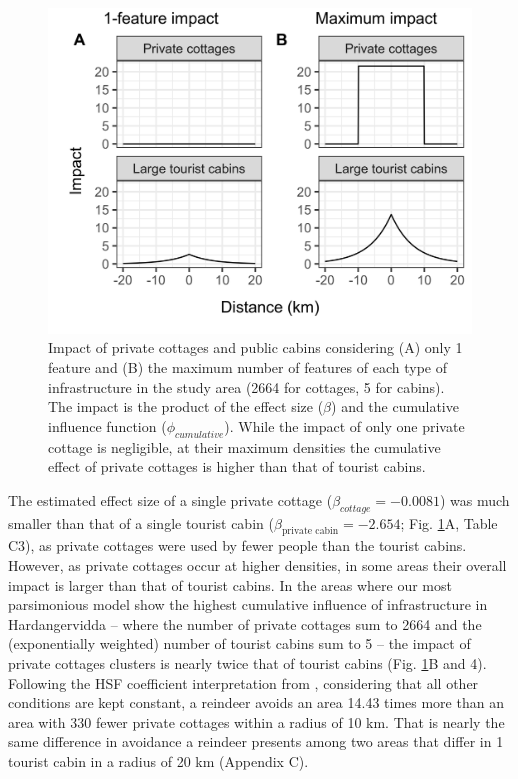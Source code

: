 \documentclass[titlepage]{article}
\begin{document}
\begin{figure}[h]
\centering
\includegraphics[width=1\textwidth,center]{figures/reindeer_zoi_impact_single_multiple_features.png}
\caption{\label{fig:impact_plot} Impact of private cottages and public cabins considering (A) only 1 feature and (B) the maximum number of features of each type of infrastructure in the study area (2664 for cottages, 5 for cabins). The impact is the product of the effect size ($\beta$) and the cumulative influence function ($\phi_{cumulative}$). While the impact of only one private cottage is negligible, at their maximum densities the cumulative effect of private cottages is higher than that of tourist cabins.}
\end{figure}

The estimated effect size of a single private
cottage ($\beta_{cottage} = -0.0081$) was much smaller than that of a single tourist cabin
($\beta_{\text{private cabin}} = -2.654$; Fig. \ref{fig:impact_plot}A, Table C3), as
private cottages were used by fewer people than the tourist cabins. However, as
private cottages occur at higher densities, in some areas their overall impact 
is larger than that of tourist cabins. In the areas where our most parsimonious model show the 
highest cumulative influence of infrastructure in Hardangervidda -- where the number of private cottages sum to 2664
and the (exponentially weighted) number of tourist cabins sum to 5 -- the impact of 
private cottages clusters is nearly twice that of tourist cabins
 (Fig. \ref{fig:impact_plot}B and 4). Following the HSF coefficient interpretation from \citet{fieberg_how_2021}, considering that all other conditions are kept constant, a reindeer avoids an area 14.43 times more than an area with
330 fewer private cottages within a radius of 10 km. That is nearly the same difference in avoidance a reindeer presents among two areas 
that differ in 1 tourist cabin in a radius of 20 km (Appendix C).
\end{document}
